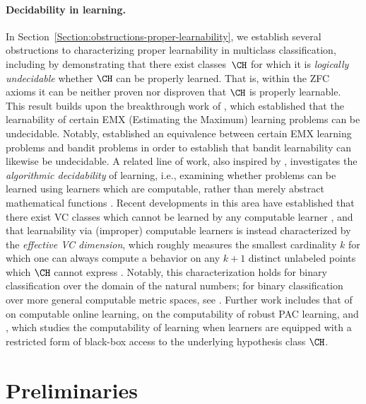 \documentclass[11pt]{article}
\begin{document}
\paragraph{Decidability in learning.} In Section~\ref{Section:obstructions-proper-learnability}, we establish several obstructions to characterizing proper learnability in multiclass classification, including by demonstrating that there exist classes~$\CH$ for which it is \emph{logically undecidable} whether $\CH$ can be properly learned. That is, within the ZFC axioms it can be neither proven nor disproven that $\CH$ is properly learnable. This result builds upon the breakthrough work of \citet{ben2019learnability}, which established that the learnability of certain EMX (Estimating the Maximum) learning problems can be undecidable. Notably, \citet{bandit-undecidable} established an equivalence between certain EMX learning problems and bandit problems in order to establish that bandit learnability can likewise be undecidable. 
A related line of work, also inspired by \citet{ben2019learnability}, investigates the \emph{algorithmic decidability} of learning, i.e., examining whether problems can be learned using learners which are computable, rather than merely abstract mathematical functions
\citep{agarwal2020learnability}. Recent developments in this area have established that there exist VC classes which cannot be learned by any computable learner \citep{sterkenburg2022characterizations}, and that learnability via (improper) computable learners is instead characterized by the \emph{effective VC dimension}, which roughly measures the smallest cardinality $k$ for which one can always compute a behavior on any $k + 1$ distinct unlabeled points which $\CH$ cannot express \citep{delle2023find}. Notably, this characterization holds for binary classification over the domain of the natural numbers; for binary classification over more general computable metric spaces, see \citet{ackerman2022computable}. 
Further work includes that of \citet{hasrati2023computable} on computable online learning, \citet{gourdeau2024computability} on the computability of robust PAC learning, and \citet{caro2023undecidability}, which studies the computability of learning when learners are equipped with a restricted form of black-box access to the underlying hypothesis class $\CH$.


\section{Preliminaries}\label{Section:Preliminaries}
\end{document}
